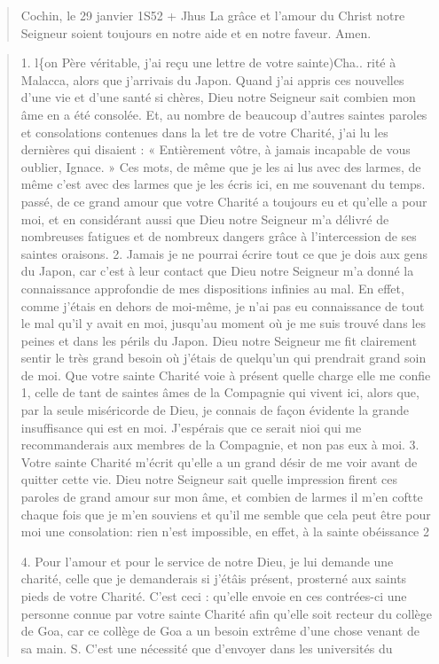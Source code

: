 \begin{quote}
    Cochin, le 29 janvier 1S52
+
Jhus
La grâce et l'amour du Christ notre Seigneur soient toujours en
notre aide et en notre faveur. Amen.
\end{quote}

\begin{quote}
    1. l\{on Père véritable, j'ai reçu une lettre de votre sainte)Cha..
rité à Malacca, alors que j'arrivais du Japon. Quand j'ai appris
ces nouvelles d'une vie et d'une santé si chères, Dieu notre Seigneur
sait combien mon âme en a été consolée. Et, au nombre de beaucoup
d'autres saintes paroles et consolations contenues dans la let
tre de votre Charité, j'ai lu les dernières qui disaient : « Entièrement
vôtre, à jamais incapable de vous oublier, Ignace. » Ces
mots, de même que je les ai lus avec des larmes, de même c'est avec
des larmes que je les écris ici, en me souvenant du temps. passé,
de ce grand amour que votre Charité a toujours eu et qu'elle a pour
moi, et en considérant aussi que Dieu notre Seigneur m'a délivré
de nombreuses fatigues et de nombreux dangers grâce à l'intercession
de ses saintes oraisons.
2. Jamais je ne pourrai écrire tout ce que je dois aux gens du
Japon, car c'est à leur contact que Dieu notre Seigneur m'a donné
la connaissance approfondie de mes dispositions infinies au mal.
En effet, comme j'étais en dehors de moi-même, je n'ai pas eu
connaissance de tout le mal qu'il y avait en moi, jusqu'au moment
où je me suis trouvé dans les peines et dans les périls du Japon.
Dieu notre Seigneur me fit clairement sentir le très grand besoin
où j'étais de quelqu'un qui prendrait grand soin de moi. Que votre
sainte Charité voie à présent quelle charge elle me confie 1, celle
de tant de saintes âmes de la Compagnie qui vivent ici, alors que,
par la seule miséricorde de Dieu, je connais de façon évidente la
grande insuffisance qui est en moi. J'espérais que ce serait nioi qui
me recommanderais aux membres de la Compagnie, et non pas eux
à moi.
3. Votre sainte Charité m'écrit qu'elle a un grand désir de me
voir avant de quitter cette vie. Dieu notre Seigneur sait quelle
impression firent ces paroles de grand amour sur mon âme, et
combien de larmes il m'en coftte chaque fois que je m'en souviens
et qu'il me semble que cela peut être pour moi une consolation:
rien n'est impossible, en effet, à la sainte obéissance 2

4. Pour l'amour et pour le service de notre Dieu, je lui demande
une charité, celle que je demanderais si j'étâis présent, prosterné
aux saints pieds de votre Charité. C'est ceci : qu'elle envoie en ces
contrées-ci une personne connue par votre sainte Charité afin
qu'elle soit recteur du collège de Goa, car ce collège de Goa a un
besoin extrême d'une chose venant de sa main.
S. C'est une nécessité que d'envoyer dans les universités du
\end{quote}

